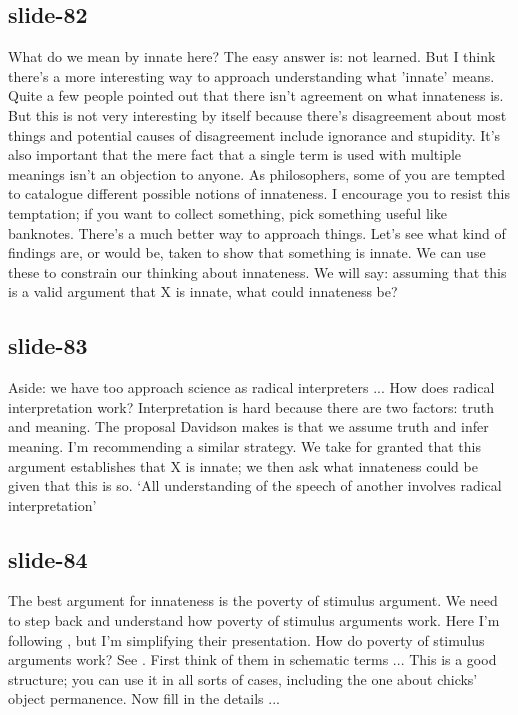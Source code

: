 \documentclass[12pt,\papersize]{extarticle}
\begin{document}
\subsection{slide-82}
What do we mean by innate here?
The easy answer is: not learned.
But I think there's a more interesting way to approach understanding what 'innate' means.
Quite a few people pointed out that there isn't agreement on what innateness is.
But this is not very interesting by itself because there's disagreement about most things and potential causes of disagreement include ignorance and stupidity.
It's also important that the mere fact that a single term is used with multiple meanings isn't an objection to anyone.
As philosophers, some of you are tempted to catalogue different possible notions of innateness.
I encourage you to resist this temptation; if you want to collect something, pick something useful like banknotes.
There's a much better way to approach things.
Let's see what kind of findings are, or would be, taken to show that something is innate.
We can use these to constrain our thinking about innateness.
We will say: assuming that this is a valid argument that X is innate, what could innateness be?
 
 
\subsection{slide-83}
Aside: we have too approach science as radical interpreters ...
How does radical interpretation work?
Interpretation is hard because there are two factors: truth and meaning.
The proposal Davidson makes is that we assume truth and infer meaning.
I'm recommending a similar strategy.
We take for granted that this argument establishes that X is innate; we then ask what innateness could be given that this is so.
‘All understanding of the speech of another involves radical interpretation’
\citep[p.\ 125]{Davidson:1973jx}
 
 
\subsection{slide-84}
The best argument for innateness is the poverty of stimulus argument.
We need to step back and understand how poverty of stimulus arguments work.
Here I'm following \citet{pullum:2002_empirical}, but I'm simplifying their presentation.
How do poverty of stimulus arguments work? See \citet{pullum:2002_empirical}.
First think of them in schematic terms ...
This is a good structure; you can use it in all sorts of cases, including the one about chicks' object permanence.
Now fill in the details ...
 
\end{document}
